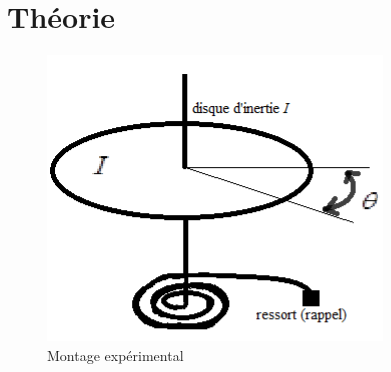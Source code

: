 \section{Théorie}

\begin{figure}
    \centering
    \includegraphics[width=\linewidth]{figures/montage.png}
    \caption{Montage expérimental \cite{notice}}
    \label{fig:montage_exp}
\end{figure}

